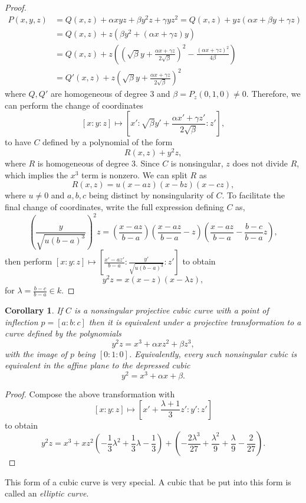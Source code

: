 \documentclass{article}
\newtheorem*{corollary*}{Corollary}
\theoremstyle{remark}
\begin{document}
\begin{proof}
\begin{align*}
 P(x,y,z)&=Q(x,z) + \alpha xyz + \beta y^2 z + \gamma yz^2=Q(x,z) + yz(\alpha x + \beta y + \gamma z)\\
 &=Q(x,z)+z(\beta y^2 +(\alpha x+\gamma z)y)\\
 &=Q(x,z)+z((\sqrt{\beta}y+\frac{\alpha x+\gamma z}{2\sqrt{\beta}})^2-\frac{(\alpha x+\gamma z)^2}{4\beta})\\
 &=Q'(x,z)+z(\sqrt{\beta}y+\frac{\alpha x+\gamma z}{2\sqrt{\beta}})^2
 \end{align*}
 where $Q,Q'$ are homogeneous of degree $3$ and $\beta=P_z(0,1,0)\neq 0$. Therefore, we can perform the change of coordinates
 \[ [x:y:z] \mapsto [x':\sqrt{\beta}y'+\frac{\alpha x'+\gamma z'}{2\sqrt{\beta}}:z'],\]
 to have $C$ defined by a polynomial of the form
 \[R(x,z)+y^2z,\]
 where $R$ is homogeneous of degree 3. Since $C$ is nonsingular, $z$ does not divide $R$, which implies the $x^3$ term is nonzero. We can split $R$ as 
 \[R(x,z)=u(x-az)(x-bz)(x-cz),\]
 where $u\neq 0$ and $a,b,c$ being distinct by nonsingularity of $C$. To facilitate the final change of coordinates, write the full expression defining $C$ as,
 \[\left( \frac{y}{\sqrt{u(b-a)^3}}\right) ^2z=\left(\frac{x-az}{b-a}\right)\left(\frac{x-az}{b-a}-z\right)\left(\frac{x-az}{b-a}-\frac{b-c}{b-a}z\right),\]
 then perform $[x:y:z]\mapsto [\frac{x'-az'}{b-a}:\frac{y'}{\sqrt{u(b-a)^3}}:z']$ to obtain
 \[y^2 z=x(x-z)(x-\lambda z),\]
for $\lambda=\frac{b-c}{b-a}\in k$. 
\end{proof}
\begin{corollary*}
If $C$ is a nonsingular projective cubic curve with a point of inflection $p=[a:b:c]$ then it is equivalent under a projective transformation to a curve defined by the polynomials
\[ y^2 z=x^3+\alpha x z^2 +\beta z^3,\]
with the image of $p$ being $[0:1:0]$.
Equivalently, every such nonsingular cubic is equivalent in the affine plane to the depressed cubic
\[ y^2=x^3+\alpha x + \beta.\]
\end{corollary*}
\begin{proof}
Compose the above transformation with 
\[[x:y:z]\mapsto [x'+\frac{\lambda +1}{3}z':y':z'] \]
to obtain
\[ y^2z=x^3+xz^2(-\frac{1}{3}\lambda ^2+\frac{1}{3}\lambda-\frac{1}{3})+(-\frac{2\lambda^3}{27}+\frac{\lambda^2}{9}+\frac{\lambda}{9}-\frac{2}{27}).\]
\end{proof}
This form of a cubic curve is very special. A cubic that be put into this form is called an \textit{elliptic curve}.
\end{document}
